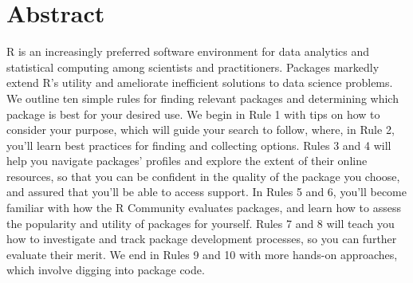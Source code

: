\documentclass[10pt,letterpaper]{article}
\newcommand{\getIndex}[2]{
  \ForEach{,}{\IfEq{#1}{\thislevelitem}{\number\thislevelcount\ExitForEach}{}}{#2}
}
\newcommand{\getAff}[1]{
  \getIndex{#1}{Stats,Math,ERHS}
}
\begin{document}
\vspace*{0.2in}

\section*{Abstract}
R is an increasingly preferred software environment for data analytics
and statistical computing among scientists and practitioners. Packages
markedly extend R's utility and ameliorate inefficient solutions to data
science problems. We outline ten simple rules for finding relevant
packages and determining which package is best for your desired use. We
begin in Rule 1 with tips on how to consider your purpose, which will
guide your search to follow, where, in Rule 2, you'll learn best
practices for finding and collecting options. Rules 3 and 4 will help
you navigate packages' profiles and explore the extent of their online
resources, so that you can be confident in the quality of the package
you choose, and assured that you'll be able to access support. In Rules
5 and 6, you'll become familiar with how the R Community evaluates
packages, and learn how to assess the popularity and utility of packages
for yourself. Rules 7 and 8 will teach you how to investigate and track
package development processes, so you can further evaluate their merit.
We end in Rules 9 and 10 with more hands-on approaches, which involve
digging into package code.
\end{document}
